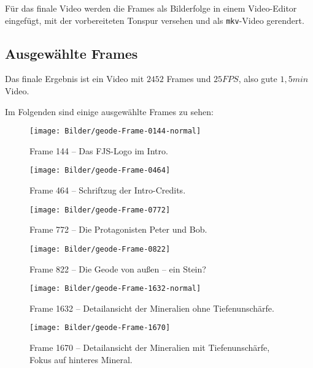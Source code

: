 \documentclass{scrreprt}
\begin{document}
Für das finale Video werden die Frames als Bilderfolge in einem Video-Editor eingefügt, mit der vorbereiteten Tonspur versehen und als \texttt{mkv}-Video gerendert.

\subsection{Ausgewählte Frames}

Das finale Ergebnis ist ein Video mit $2452$ Frames und $25\unit{FPS}$, also gute $1,5\unit{min}$ Video.

Im Folgenden sind einige ausgewählte Frames zu sehen:

\begin{figure}[!ht]
\centering
\texttt{[image: Bilder/geode-Frame-0144-normal]}
\caption{Frame 144 -- Das FJS-Logo im Intro.}
\label{frame144-logo}
\end{figure}

\begin{figure}[!ht]
\centering
\texttt{[image: Bilder/geode-Frame-0464]}
\caption{Frame 464 -- Schriftzug der Intro-Credits.}
\label{frame464-credits}
\end{figure}

\begin{figure}[!ht]
\centering
\texttt{[image: Bilder/geode-Frame-0772]}
\caption{Frame 772 -- Die Protagonisten Peter und Bob.}
\label{frame772-peterbob}
\end{figure}

\begin{figure}[!ht]
\centering
\texttt{[image: Bilder/geode-Frame-0822]}
\caption{Frame 822 -- Die Geode von außen -- ein Stein?}
\label{frame822-rock}
\end{figure}

\begin{figure}[!ht]
\centering
\texttt{[image: Bilder/geode-Frame-1632-normal]}
\caption{Frame 1632 -- Detailansicht der Mineralien ohne Tiefenunschärfe.}
\label{frame1632-detail}
\end{figure}

\begin{figure}[!ht]
\centering
\texttt{[image: Bilder/geode-Frame-1670]}
\caption{Frame 1670 -- Detailansicht der Mineralien mit Tiefenunschärfe, Fokus auf hinteres Mineral.}
\label{frame1670-detail-DoF1}
\end{figure}
\end{document}
